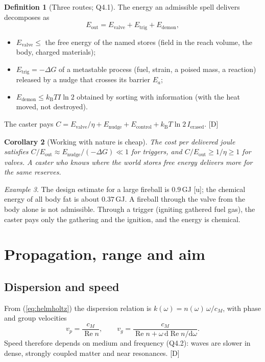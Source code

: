 \documentclass[11pt,a4paper]{article}
\numberwithin{equation}{section}
\theoremstyle{definition}
\newtheorem{definition}{Definition}[section]
\theoremstyle{plain}
\newtheorem{corollary}[definition]{Corollary}
\theoremstyle{remark}
\newtheorem{example}[definition]{Example}
\newcommand{\kB}{k_{\mathrm B}}
\newcommand{\cM}{c_{M}}
\newcommand{\dd}{\mathrm d}
\newcommand{\tagD}{\textcolor{tag}{\textsf{[D]}}}
\newcommand{\tagU}{\textcolor{tag}{\textsf{[u]}}}
\begin{document}
\begin{definition}[Three routes; Q4.1]
The energy an admissible spell delivers decomposes as
\begin{equation}
E_{\text{out}} = E_{\text{valve}}+E_{\text{trig}}+E_{\text{demon}},
\end{equation}
\begin{itemize}
\item $E_{\text{valve}}\le$ the free energy of the named stores (field in the reach volume, the body, charged materials);
\item $E_{\text{trig}}=-\Delta G$ of a metastable process (fuel, strain, a poised mass, a reaction) released by a nudge that crosses its barrier $E_a$;
\item $E_{\text{demon}}\le \kB T I\ln 2$ obtained by sorting with information (with the heat moved, not destroyed).
\end{itemize}
The caster pays $C = E_{\text{valve}}/\eta + E_{\text{nudge}} + E_{\text{control}} + \kB T\ln2\, I_{\text{erased}}$. \tagD
\end{definition}
\begin{corollary}[Working with nature is cheap]
The cost per delivered joule satisfies $C/E_{\text{out}}\approx E_{\text{nudge}}/(-\Delta G)\ll1$ for triggers, and $C/E_{\text{out}}\ge 1/\eta\ge1$ for valves. A caster who knows where the world stores free energy delivers more for the same reserves.
\end{corollary}
\begin{example}
The design estimate for a large fireball is $0.9$\,GJ \tagU; the chemical energy of all body fat is about $0.37$\,GJ. A fireball through the valve from the body alone is not admissible. Through a trigger (igniting gathered fuel gas), the caster pays only the gathering and the ignition, and the energy is chemical.
\end{example}

\section{Propagation, range and aim}\label{sec:prop}

\subsection{Dispersion and speed}
From (\ref{eq:helmholtz}) the dispersion relation is $k(\omega)=n(\omega)\,\omega/\cM$, with phase and group velocities
\begin{equation}
v_p=\frac{\cM}{\operatorname{Re}n},\qquad v_g=\frac{\cM}{\operatorname{Re}n+\omega\,\dd\operatorname{Re}n/\dd\omega}.
\end{equation}
Speed therefore depends on medium and frequency (Q4.2): waves are slower in dense, strongly coupled matter and near resonances. \tagD
\end{document}
